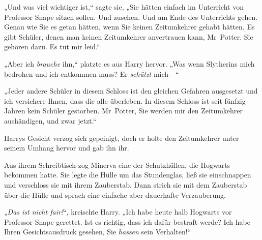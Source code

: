 „Und was viel wichtiger ist,“ sagte sie, „Sie hätten einfach im Unterricht von Professor Snape sitzen sollen. Und zusehen. Und am Ende des Unterrichts gehen. Genau wie Sie es getan hätten, wenn Sie keinen Zeitumkehrer gehabt hätten. Es gibt Schüler, denen man keinen Zeitumkehrer anvertrauen kann, Mr~Potter. Sie gehören dazu. Es tut mir leid.“

„Aber ich \emph{brauche} ihn,“ platzte es aus Harry hervor. „Was wenn Slytherins mich bedrohen und ich entkommen muss? Er \emph{schützt} mich—“

„Jeder andere Schüler in diesem Schloss ist den gleichen Gefahren ausgesetzt und ich versichere Ihnen, dass die alle überleben. In diesem Schloss ist seit fünfzig Jahren kein Schüler gestorben. Mr~Potter, Sie werden mir den Zeitumkehrer aushändigen, und zwar jetzt.“

Harrys Gesicht verzog sich gepeinigt, doch er holte den Zeitumkehrer unter seinem Umhang hervor und gab ihn ihr.

Aus ihrem Schreibtisch zog Minerva eine der Schutzhüllen, die Hogwarts bekommen hatte. Sie legte die Hülle um das Stundenglas, ließ sie einschnappen und verschloss sie mit ihrem Zauberstab. Dann strich sie mit dem Zauberstab über die Hülle und sprach eine einfache aber dauerhafte Verzauberung.

„\emph{Das ist nicht fair!}“, kreischte Harry. „Ich habe heute halb Hogwarts vor Professor Snape gerettet. Ist es richtig, dass ich dafür bestraft werde? Ich habe Ihren Gesichtsausdruck gesehen, Sie \emph{hassen} sein Verhalten!“

